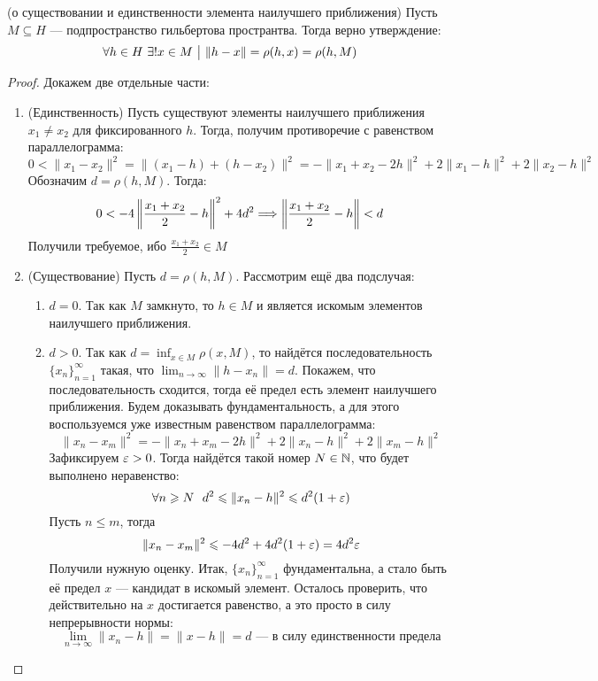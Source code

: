 \begin{lemma} (о существовании и единственности элемента наилучшего приближения)
	Пусть $M \subseteq H$ --- подпространство гильбертова пространтва. Тогда верно утверждение:
	\[
		\forall h \in H\ \exists! x \in M \ \big|\  \|h - x\| = \rho(h, x) = \rho(h, M)
	\]
\end{lemma}

\begin{proof}
	Докажем две отдельные части:
	\begin{enumerate}
		\item (Единственность) Пусть существуют элементы наилучшего приближения $x_1 \neq x_2$ для фиксированного $h$. Тогда, получим противоречие с равенством параллелограмма:
		\[
			0 < \|x_1 - x_2\|^2 = \|(x_1 - h) + (h - x_2)\|^2 = -\|x_1 + x_2 - 2h\|^2 + 2\|x_1 - h\|^2 + 2\|x_2 - h\|^2
		\]
		Обозначим $d = \rho(h, M)$. Тогда:
		\[
			0 < -4\left\|\frac{x_1 + x_2}{2} - h\right\|^2 + 4d^2 \Longrightarrow \left\|\frac{x_1 + x_2}{2} - h\right\| < d
		\]
		Получили требуемое, ибо $\frac{x_1 + x_2}{2} \in M$
		
		\item (Существование) Пусть $d = \rho(h, M)$. Рассмотрим ещё два подслучая:
		\begin{enumerate}
			\item $d = 0$. Так как $M$ замкнуто, то $h \in M$ и является искомым элементов наилучшего приближения.
			
			\item $d > 0$. Так как $d = \inf_{x \in M} \rho(x, M)$, то найдётся последовательность $\{x_n\}_{n = 1}^\infty$ такая, что $\lim_{n \to \infty} \|h - x_n\| = d$. Покажем, что последовательность сходится, тогда её предел есть элемент наилучшего приближения. Будем доказывать фундаментальность, а для этого воспользуемся уже известным равенством параллелограмма:
			\[
				\|x_n - x_m\|^2 = -\|x_n + x_m - 2h\|^2 + 2\|x_n - h\|^2 + 2\|x_m - h\|^2
			\]
			Зафиксируем $\varepsilon > 0$. Тогда найдётся такой номер $N \in \mathbb{N}$, что будет выполнено неравенство:
			\[
				\forall n \geqslant N\ \ d^2 \leqslant \|x_n - h\|^2 \leqslant d^2(1 + \varepsilon)
			\]
			Пусть $n \le m$, тогда
			\[
				\|x_n - x_m\|^2 \leqslant -4d^2 + 4d^2(1 + \varepsilon) = 4d^2\varepsilon
			\]
			Получили нужную оценку. Итак, $\{x_n\}_{n = 1}^\infty$ фундаментальна, а стало быть её предел $x$ --- кандидат в искомый элемент. Осталось проверить, что действительно на $x$ достигается равенство, а это просто в силу непрерывности нормы:
			\[
				\lim_{n \to \infty} \|x_n - h\| = \|x - h\| = d \text{ --- в силу единственности предела}
			\]
		\end{enumerate}
	\end{enumerate}
\end{proof}

